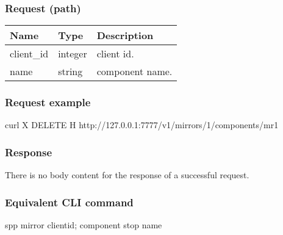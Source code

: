 \documentclass[a4paper,11pt,openany,oneside,english]{sphinxmanual}
\begin{document}
\subsubsection{Request (path)}
\label{\detokenize{api_ref/spp_mirror:id5}}

\begin{savenotes}\sphinxattablestart
\centering
{}
\sphinxthecaptionisattop
{}\label{\detokenize{api_ref/spp_mirror:id20}}\label{\detokenize{api_ref/spp_mirror:table-spp-ctl-spp-mirror-del}}
\sphinxaftertopcaption
\begin{tabulary}{\linewidth}[t]{|T|T|T|}
\hline
\sphinxstyletheadfamily 
Name
&\sphinxstyletheadfamily 
Type
&\sphinxstyletheadfamily 
Description
\\
\hline
client\_id
&
integer
&
client id.
\\
\hline
name
&
string
&
component name.
\\
\hline
\end{tabulary}
\par
\sphinxattableend\end{savenotes}


\subsubsection{Request example}
\label{\detokenize{api_ref/spp_mirror:id6}}
\begin{sphinxVerbatim}[commandchars=\\\{\},formatcom=\footnotesize]
 curl \PYGZhy{}X DELETE \PYGZhy{}H  
  http://127.0.0.1:7777/v1/mirrors/1/components/mr1
\end{sphinxVerbatim}


\subsubsection{Response}
\label{\detokenize{api_ref/spp_mirror:id7}}
There is no body content for the response of a successful  request.


\subsubsection{Equivalent CLI command}
\label{\detokenize{api_ref/spp_mirror:id8}}
\begin{sphinxVerbatim}[commandchars=\\\{\},formatcom=\footnotesize]
spp \PYGZgt{} mirror \PYGZob{}client\PYGZus{}id\PYGZcb{}; component stop \PYGZob{}name\PYGZcb{}
\end{sphinxVerbatim}
\end{document}
